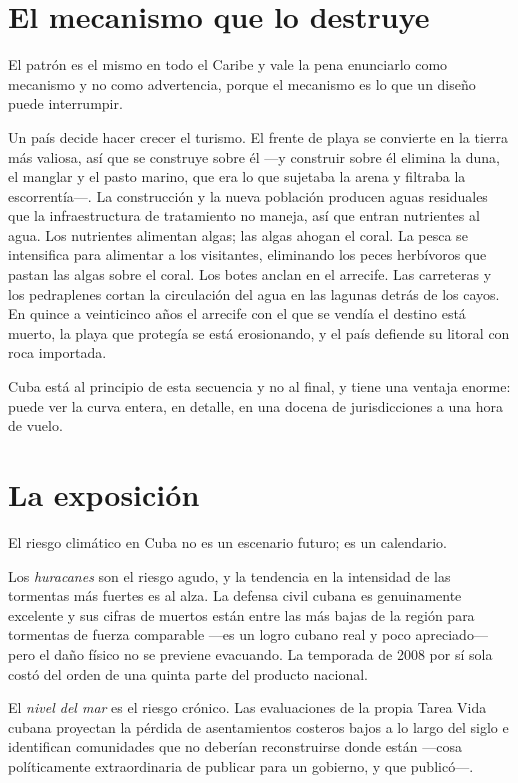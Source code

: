 \section{El mecanismo que lo destruye}

El patrón es el mismo en todo el Caribe y vale la pena enunciarlo como mecanismo y no como
advertencia, porque el mecanismo es lo que un diseño puede interrumpir.

Un país decide hacer crecer el turismo. El frente de playa se convierte en la tierra más valiosa,
así que se construye sobre él ---y construir sobre él elimina la duna, el manglar y el pasto
marino, que era lo que sujetaba la arena y filtraba la escorrentía---. La construcción y la nueva
población producen aguas residuales que la infraestructura de tratamiento no maneja, así que
entran nutrientes al agua. Los nutrientes alimentan algas; las algas ahogan el coral. La pesca se
intensifica para alimentar a los visitantes, eliminando los peces herbívoros que pastan las algas
sobre el coral. Los botes anclan en el arrecife. Las carreteras y los pedraplenes cortan la
circulación del agua en las lagunas detrás de los cayos. En quince a veinticinco años el arrecife
con el que se vendía el destino está muerto, la playa que protegía se está erosionando, y el país
defiende su litoral con roca importada.

Cuba está al principio de esta secuencia y no al final, y tiene una ventaja enorme: puede ver la
curva entera, en detalle, en una docena de jurisdicciones a una hora de vuelo.

\section{La exposición}

El riesgo climático en Cuba no es un escenario futuro; es un calendario.

Los \emph{huracanes} son el riesgo agudo, y la tendencia en la intensidad de las tormentas más
fuertes es al alza. La defensa civil cubana es genuinamente excelente y sus cifras de muertos
están entre las más bajas de la región para tormentas de fuerza comparable ---es un logro cubano
real y poco apreciado--- pero el daño físico no se previene evacuando. La temporada de 2008 por
sí sola costó del orden de una quinta parte del producto nacional.

El \emph{nivel del mar} es el riesgo crónico. Las evaluaciones de la propia Tarea Vida cubana
proyectan la pérdida de asentamientos costeros bajos a lo largo del siglo e identifican
comunidades que no deberían reconstruirse donde están ---cosa políticamente extraordinaria de
publicar para un gobierno, y que publicó---.

